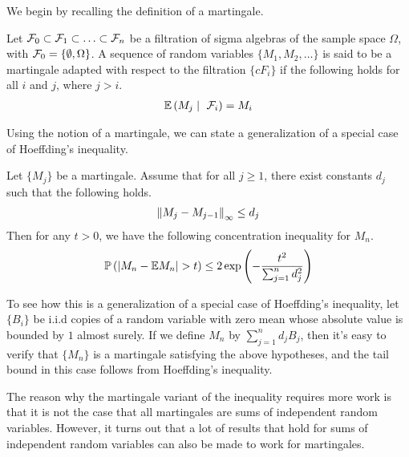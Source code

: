 \documentclass[11pt]{article}
\begin{document}
We begin by recalling the definition of a martingale.
\begin{definition}[Martingale]
  Let $\mathcal{F}_0 \subset \mathcal{F}_1 \subset \ldots \subset \mathcal{F}_n$ be a filtration of sigma algebras of the sample space $\Omega$, with $\mathcal{F}_0 = \{\emptyset, \Omega\}$.
  A sequence of random variables $\{M_1, M_2, \ldots\}$ is said to be a martingale adapted with respect to the filtration $\{ cF_i\}$ if the following holds for all $i$ and $j$, where $j > i$.
  \begin{align*}
    \mathbb{E}\left( M_j \mid\ \mathcal{F}_i \right) = M_i
  \end{align*}
\end{definition}

Using the notion of a martingale, we can state a generalization of a special case of Hoeffding's inequality.

\begin{theorem}
  \label{thm:azuma-martingale}
  Let $\{M_j\}$ be a martingale. Assume that for all $j \geq 1$, there exist constants $d_j$ such that the following holds.
  \begin{align*}
    \left\lVert M_j - M_{j-1}\right\rVert_{\infty} \leq d_j
  \end{align*}
  Then for any $t > 0$, we have the following concentration inequality for $M_n$.
  \begin{align*}
    \mathbb{P}\left( \left| M_n - \mathbb{E} M_n \right| > t \right)
    \leq 2 \exp\left( - \frac{t^2}{\sum_{j=1}^n d_j^2} \right)
  \end{align*}
\end{theorem}
To see how this is a generalization of a special case of Hoeffding's inequality, let $\{B_i\}$ be i.i.d copies of a random variable with zero mean whose absolute value is bounded by $1$ almost surely.
If we define $M_n$ by $\sum_{j=1}^n d_jB_j$, then it's easy to verify that $\{M_n\}$ is a martingale satisfying the above hypotheses, and the tail bound in this case follows from Hoeffding's inequality.

The reason why the martingale variant of the inequality requires more work is that it is not the case that all martingales are sums of independent random variables.
However, it turns out that a lot of results that hold for sums of independent random variables can also be made to work for martingales.
\end{document}
